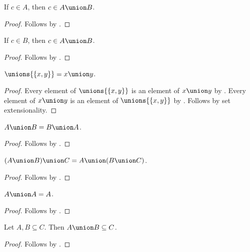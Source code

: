 \begin{proposition}\label{union_intro_left}
    If $c\in A$, then $c\in A\union B$.
\end{proposition}
\begin{proof}
    Follows by .
\end{proof}

\begin{proposition}\label{union_intro_right}
    If $c\in B$, then $c\in A\union B$.
\end{proposition}
\begin{proof}
    Follows by .
\end{proof}

\begin{proposition}\label{union_as_unions}
    $\unions{\{x,y\}} = x\union y$.
\end{proposition}
\begin{proof}
    Every element of $\unions{\{x,y\}}$ is an element of $x\union y$
        by .
    Every element of $x\union y$ is an element of $\unions{\{x,y\}}$
        by .
    Follows by set extensionality.
\end{proof}

\begin{proposition}%
\label{union_comm}
    $A\union B = B\union A$.
\end{proposition}
\begin{proof}
    Follows by .
\end{proof}

\begin{proposition}%
\label{union_assoc}
    $(A\union B)\union C = A\union (B\union C)$.
\end{proposition}
\begin{proof}
    Follows by .
\end{proof}

\begin{proposition}%
\label{union_idempotent}
    $A\union A = A$.
\end{proposition}
\begin{proof}
    Follows by .
\end{proof}

\begin{classification}\label{union_subsets_is_subset}
    Let $A,B\subseteq C$.
    Then $A\union B\subseteq C$.
\end{classification}
\begin{proof}
    Follows by .
\end{proof}

